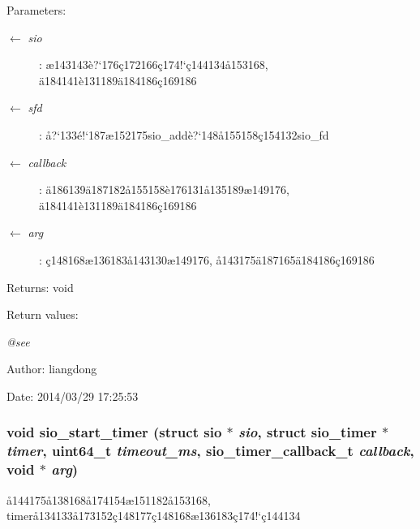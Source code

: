 \begin{Desc}
\item[Parameters:]
\begin{description}
\item[\mbox{$\leftarrow$} {\em sio}]: \ae{}143143\`{e}?`176\c{c}172166\c{c}174!`\c{c}144134\aa{}153168, \"{a}184141\`{e}131189\"{a}184186\c{c}169186 \item[\mbox{$\leftarrow$} {\em sfd}]: \aa{}?`133\'{e}!`187\ae{}152175sio\_\-add\`{e}?`148\aa{}155158\c{c}154132sio\_\-fd \item[\mbox{$\leftarrow$} {\em callback}]: \"{a}186139\"{a}187182\aa{}155158\`{e}176131\aa{}135189\ae{}149176, \"{a}184141\`{e}131189\"{a}184186\c{c}169186 \item[\mbox{$\leftarrow$} {\em arg}]: \c{c}148168\ae{}136183\aa{}143130\ae{}149176, \aa{}143175\"{a}187165\"{a}184186\c{c}169186 \end{description}
\end{Desc}
\begin{Desc}
\item[Returns:]void \end{Desc}
\begin{Desc}
\item[Return values:]
\begin{description}
\item[{\em @see}]\end{description}
\end{Desc}
\begin{Desc}
\item[Author:]liangdong \end{Desc}
\begin{Desc}
\item[Date:]2014/03/29 17:25:53 \end{Desc}
\subsubsection{\setlength{\rightskip}{0pt plus 5cm}void sio\_\-start\_\-timer (struct sio $\ast$ {\em sio}, struct sio\_\-timer $\ast$ {\em timer}, uint64\_\-t {\em timeout\_\-ms}, sio\_\-timer\_\-callback\_\-t {\em callback}, void $\ast$ {\em arg})}\label{sio_8h_a15}


\aa{}144175\aa{}138168\aa{}174154\ae{}151182\aa{}153168, timer\aa{}134133\aa{}173152\c{c}148177\c{c}148168\ae{}136183\c{c}174!`\c{c}144134 

